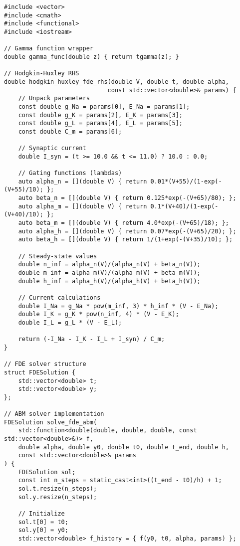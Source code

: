 \documentclass[a4paper,12pt]{article}
\begin{document}
\begin{lstlisting}[style=cpp, caption={C++ implementation of ABM solver for FDEs}, label={lst:cpp-fde}]
#include <vector>
#include <cmath>
#include <functional>
#include <iostream>

// Gamma function wrapper
double gamma_func(double z) { return tgamma(z); }

// Hodgkin-Huxley RHS
double hodgkin_huxley_fde_rhs(double V, double t, double alpha, 
                             const std::vector<double>& params) {
    // Unpack parameters
    const double g_Na = params[0], E_Na = params[1];
    const double g_K = params[2], E_K = params[3];
    const double g_L = params[4], E_L = params[5];
    const double C_m = params[6];
    
    // Synaptic current
    double I_syn = (t >= 10.0 && t <= 11.0) ? 10.0 : 0.0;
    
    // Gating functions (lambdas)
    auto alpha_n = [](double V) { return 0.01*(V+55)/(1-exp(-(V+55)/10); };
    auto beta_n = [](double V) { return 0.125*exp(-(V+65)/80); };
    auto alpha_m = [](double V) { return 0.1*(V+40)/(1-exp(-(V+40)/10); };
    auto beta_m = [](double V) { return 4.0*exp(-(V+65)/18); };
    auto alpha_h = [](double V) { return 0.07*exp(-(V+65)/20); };
    auto beta_h = [](double V) { return 1/(1+exp(-(V+35)/10); };
    
    // Steady-state values
    double n_inf = alpha_n(V)/(alpha_n(V) + beta_n(V));
    double m_inf = alpha_m(V)/(alpha_m(V) + beta_m(V));
    double h_inf = alpha_h(V)/(alpha_h(V) + beta_h(V));
    
    // Current calculations
    double I_Na = g_Na * pow(m_inf, 3) * h_inf * (V - E_Na);
    double I_K = g_K * pow(n_inf, 4) * (V - E_K);
    double I_L = g_L * (V - E_L);
    
    return (-I_Na - I_K - I_L + I_syn) / C_m;
}

// FDE solver structure
struct FDESolution {
    std::vector<double> t;
    std::vector<double> y;
};

// ABM solver implementation
FDESolution solve_fde_abm(
    std::function<double(double, double, double, const std::vector<double>&)> f,
    double alpha, double y0, double t0, double t_end, double h,
    const std::vector<double>& params
) {
    FDESolution sol;
    const int n_steps = static_cast<int>((t_end - t0)/h) + 1;
    sol.t.resize(n_steps);
    sol.y.resize(n_steps);
    
    // Initialize
    sol.t[0] = t0;
    sol.y[0] = y0;
    std::vector<double> f_history = { f(y0, t0, alpha, params) };
    

\end{lstlisting}
\end{document}
